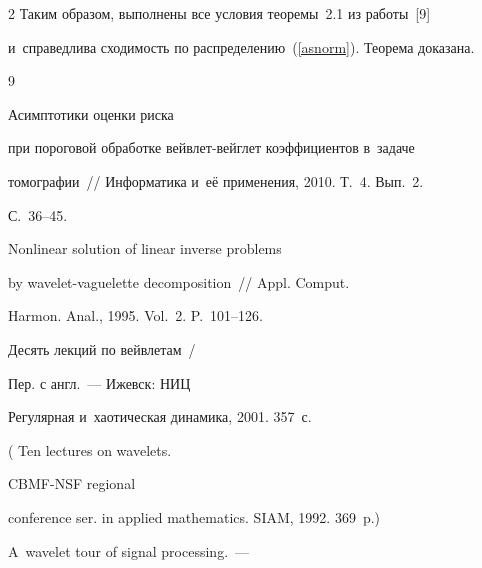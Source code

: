 \begin{multicols}{2}
Таким образом, выполнены все условия теоремы~2.1 из работы~[9]


и~справедлива сходимость по распределению~(\ref{asnorm}). Теорема доказана.











{\small\frenchspacing


 {%




 \begin{thebibliography}{9}










 Асимптотики оценки риска


при пороговой обработке вейв\-лет-вейг\-лет коэффициентов в~задаче


томографии~// Информатика и~её применения, 2010. Т.~4. Вып.~2.


С.~36--45.







 Nonlinear solution of linear inverse problems


by wavelet-vaguelette decomposition~// Appl. Comput.


Harmon. Anal., 1995. Vol.~2. P.~101--126.







 Десять лекций по вейвлетам~/


Пер. с англ.~--- Ижевск: НИЦ


Регулярная и~хаотическая динамика, 2001. 357~с.


( Ten lectures on wavelets.


CBMF-NSF regional


conference ser. in applied mathematics. SIAM, 1992. 369~p.)







 A~wavelet tour of signal processing.~---



\end{thebibliography}}}
\end{multicols}
